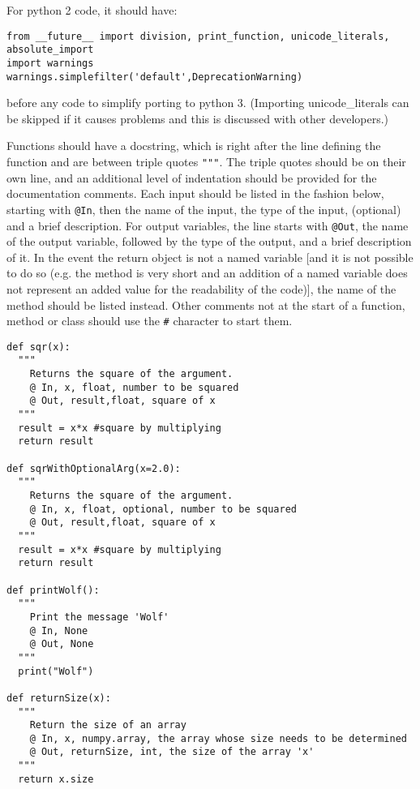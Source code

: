\documentclass{article}
\begin{document}
For python 2 code, it should have:

\begin{verbatim}
from __future__ import division, print_function, unicode_literals, absolute_import
import warnings
warnings.simplefilter('default',DeprecationWarning)
\end{verbatim}

before any code to simplify porting to python 3. (Importing unicode\_literals can be skipped if it causes problems and this is discussed with other developers.)

Functions should have a ​docstring, which is right after the line
defining the function and are between triple quotes \verb'"""'. The
triple quotes should be on their own line, and an additional level of
indentation should be provided for the documentation comments. Each
input should be listed in the fashion below, starting with \verb'@In',
then the name of the input, the type of the input, (optional) and a
brief description. For output variables, the line starts with
\verb'@Out', the name of the output variable, followed by the type of
the output, and a brief description of it. In the event the return
object is not a named variable [and it is not possible to do so
  (e.g. the method is very short and an addition of a named variable
  does not represent an added value for the readability of the code)],
the name of the method should be listed instead. Other comments not at
the start of a function, method or class should use the \verb'#'
character to start them.

\begin{verbatim}
def sqr(x):
  """
    Returns the square of the argument.
    @ In, x, float, number to be squared
    @ Out, result,float, square of x
  """
  result = x*x #square by multiplying
  return result

def sqrWithOptionalArg(x=2.0):
  """
    Returns the square of the argument.
    @ In, x, float, optional, number to be squared
    @ Out, result,float, square of x
  """
  result = x*x #square by multiplying
  return result

def printWolf():
  """
    Print the message 'Wolf'
    @ In, None
    @ Out, None
  """
  print("Wolf")

def returnSize(x):
  """
    Return the size of an array
    @ In, x, numpy.array, the array whose size needs to be determined
    @ Out, returnSize, int, the size of the array 'x'
  """
  return x.size
\end{verbatim}
\end{document}
